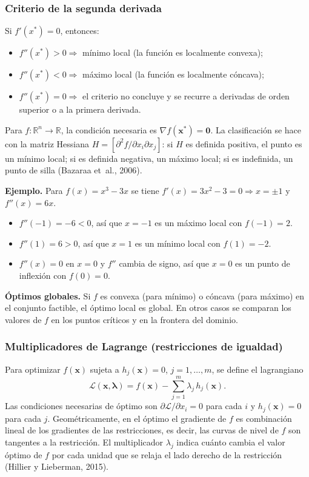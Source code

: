 \documentclass[12pt,letterpaper]{article}
\begin{document}
\subsubsection{Criterio de la segunda derivada}

Si $f'(x^*)=0$, entonces:
\begin{itemize}
	\item $f''(x^*)>0 \Rightarrow$ mínimo local (la función es localmente convexa);
	\item $f''(x^*)<0 \Rightarrow$ máximo local (la función es localmente cóncava);
	\item $f''(x^*)=0 \Rightarrow$ el criterio no concluye y se recurre a derivadas de orden superior o a la primera derivada.
\end{itemize}
Para $f:\mathbb{R}^n\to\mathbb{R}$, la condición necesaria es $\nabla f(\mathbf{x}^*)=\mathbf{0}$. La clasificación se hace con la matriz Hessiana $H=\left[\partial^2 f/\partial x_i\partial x_j\right]$: si $H$ es definida positiva, el punto es un mínimo local; si es definida negativa, un máximo local; si es indefinida, un punto de silla (Bazaraa et~al., 2006).

\textbf{Ejemplo.} Para $f(x)=x^3-3x$ se tiene $f'(x)=3x^2-3=0 \Rightarrow x=\pm1$ y $f''(x)=6x$.
\begin{itemize}
	\item $f''(-1)=-6<0$, así que $x=-1$ es un máximo local con $f(-1)=2$.
	\item $f''(1)=6>0$, así que $x=1$ es un mínimo local con $f(1)=-2$.
	\item $f''(x)=0$ en $x=0$ y $f''$ cambia de signo, así que $x=0$ es un punto de inflexión con $f(0)=0$.
\end{itemize}

\textbf{Óptimos globales.} Si $f$ es convexa (para mínimo) o cóncava (para máximo) en el conjunto factible, el óptimo local es global. En otros casos se comparan los valores de $f$ en los puntos críticos y en la frontera del dominio.

\subsubsection{Multiplicadores de Lagrange (restricciones de igualdad)}

Para optimizar $f(\mathbf{x})$ sujeta a $h_j(\mathbf{x})=0$, $j=1,\dots,m$, se define el lagrangiano
\begin{equation}
	\mathcal{L}(\mathbf{x},\boldsymbol{\lambda}) = f(\mathbf{x}) - \sum_{j=1}^{m}\lambda_j\,h_j(\mathbf{x}).
\end{equation}
Las condiciones necesarias de óptimo son $\partial\mathcal{L}/\partial x_i=0$ para cada $i$ y $h_j(\mathbf{x})=0$ para cada $j$. Geométricamente, en el óptimo el gradiente de $f$ es combinación lineal de los gradientes de las restricciones, es decir, las curvas de nivel de $f$ son tangentes a la restricción. El multiplicador $\lambda_j$ indica cuánto cambia el valor óptimo de $f$ por cada unidad que se relaja el lado derecho de la restricción (Hillier y Lieberman, 2015).
\end{document}
